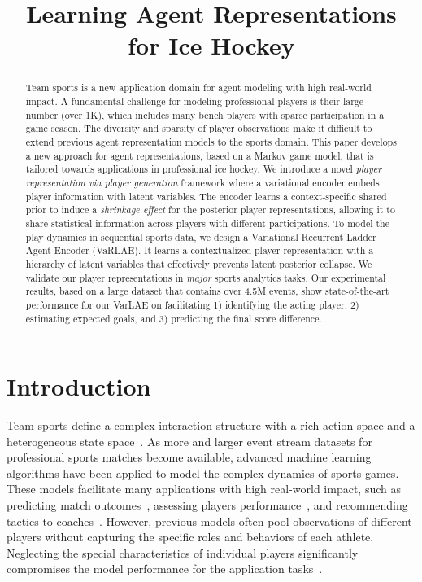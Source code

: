 \documentclass[letterpaper]{article} %
\title{Learning Agent Representations for Ice Hockey}
\author{}
\begin{document}
\linenumbers  %
\maketitle

\begin{abstract}
  Team sports is a new application domain for agent modeling with high real-world impact. A fundamental challenge for modeling professional players is their large number (over 1K), which includes many bench players with sparse participation in a game season. The diversity and sparsity of player observations make it difficult to extend previous agent representation models to the sports domain. This paper develops a new approach for agent representations, based on a Markov game model, that is tailored towards applications in professional ice hockey. We introduce a novel {\it player representation via player generation} framework where a variational encoder embeds player information with latent variables. The encoder learns a context-specific shared prior to induce a {\it shrinkage effect} for the posterior player representations, allowing it to share statistical information across players with different participations. To model the play dynamics in sequential sports data, we design a Variational Recurrent Ladder Agent Encoder (VaRLAE).  It learns a contextualized player representation with a hierarchy of latent variables that effectively prevents latent posterior collapse. We validate our player representations in {\it major} sports analytics tasks. Our experimental results, based on a large dataset that contains over 4.5M events, show state-of-the-art performance for our VarLAE on facilitating 1) identifying the acting player, 2) estimating expected goals, and 3) predicting the final score difference.
\end{abstract}

\section{Introduction}
Team sports define a complex interaction structure with a rich action space and a heterogeneous state space~\cite{Gudmundsson17TeamSports}. 
As more and larger event stream datasets for professional sports matches become available, advanced machine learning algorithms have been applied to model the complex dynamics of sports games. These models facilitate many applications with high real-world impact, such as predicting match outcomes~\cite{bunker2019machine}, assessing players performance~\cite{Liu2018,decroos2018action,schulte2017markov}, and recommending tactics to coaches~\cite{schwartz}. 
However, previous models often pool observations of different players without capturing the specific roles and behaviors of each athlete. Neglecting the special characteristics of individual players significantly compromises the  model performance for the application tasks~\cite{ganguly2018problem}.
\end{document}
